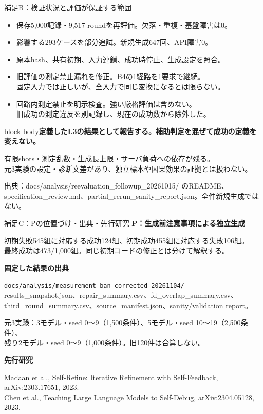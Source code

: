 \documentclass[dvipdfmx,aspectratio=169,11pt]{beamer}
\newcommand{\takeaway}[1]{\vspace{2mm}\begin{beamercolorbox}[wd=\textwidth,sep=2mm]{block body}\small\bfseries #1\end{beamercolorbox}}
\newcommand{\smallnote}[1]{{\scriptsize\color{Muted}#1\par}}
\begin{document}
\begin{frame}{補足B：検証状況と評価が保証する範囲}
\small
\begin{itemize}
\item 保存5,000記録・9,517 roundを再評価。欠落・重複・基盤障害は0。
\item 影響する293ケースを部分追試。新規生成647回、API障害0。
\item 原本hash、共有初期、入力連鎖、成功時停止、生成設定を照合。
\item 旧評価の測定禁止漏れを修正。B4の1経路を1要求で継続。\\
固定入力では正しいが、全入力で同じ変換になるとは限らない。
\item 回路内測定禁止を明示検査。強い厳格評価は含めない。\\
旧成功の測定違反を別記録し、現在の成功数から除外した。
\end{itemize}
\takeaway{定義したL3の結果として報告する。補助判定を混ぜて成功の定義を変えない。}
\smallnote{有限shots・測定乱数・生成長上限・サーバ負荷への依存が残る。\\元3実験の設定・診断文差があり、独立標本や因果効果の証拠とは扱わない。}
{\fontsize{6.5}{8}\selectfont\color{Muted} 出典：docs/analysis/reevaluation\_followup\_20261015/ のREADME、\\specification\_review.md、partial\_rerun\_sanity\_report.json。全件新規生成ではない。\par}
\end{frame}

\begin{frame}{補足C：Pの位置づけ・出典・先行研究}
\small
\textbf{P：生成前注意事項による独立生成}\par\vspace{1mm}
初期失敗545組に対応する成功124組、初期成功455組に対応する失敗106組。\\
最終成功は473/1,000組。同じ初期コードの修正とは分けて解釈する。\par\vspace{3mm}
\textbf{固定した結果の出典}\par\vspace{1mm}
{\scriptsize\texttt{docs/analysis/measurement\_ban\_corrected\_20261104/}}\\
\scriptsize results\_snapshot.json、repair\_summary.csv、fd\_overlap\_summary.csv、\\
third\_round\_summary.csv、source\_manifest.json、sanity/validation report。\par\vspace{2mm}
元3実験：3モデル・seed 0〜9（1,500条件）、5モデル・seed 10〜19（2,500条件）、\\
残り2モデル・seed 0〜9（1,000条件）。旧120件は合算しない。\par\vspace{3mm}
\textbf{先行研究}\par\vspace{1mm}
Madaan et al., Self-Refine: Iterative Refinement with Self-Feedback, arXiv:2303.17651, 2023.\\
Chen et al., Teaching Large Language Models to Self-Debug, arXiv:2304.05128, 2023.
\end{frame}
\end{document}

